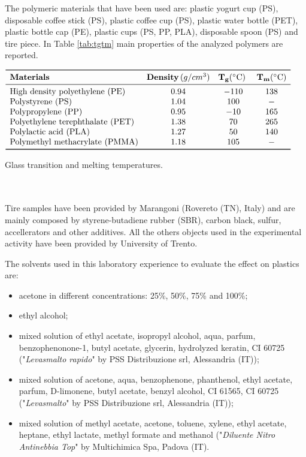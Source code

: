 \documentclass[a4paper, 11pt]{article}
\begin{document}
The polymeric materials that have been used are: plastic yogurt cup (PS), disposable coffee stick (PS), plastic coffee cup (PS), plastic water bottle (PET), plastic bottle cap (PE), plastic cups (PS, PP, PLA), disposable spoon (PS) and tire piece. In Table \ref{tab:tgtm} main properties of the analyzed polymers are reported. 
\begin{table}[htp]
	\centering
	$
	\begin{array}{lccc}
	\toprule
	\textbf{Materials} &  \mathbf{Density}\,(g/cm^{3})  & \mathbf{T_{g}} (^\circ\text{C}) \ & \mathbf{T_{m}}(^\circ\text{C}) \\
	\midrule
	\text{High density polyethylene (PE)} & 0.94 & -110 & 138 \\
	\text{Polystyrene (PS)} & 1.04 & 100 & -  \\
	\text{Polypropylene (PP)} & 0.95 & -10  & 165  \\
	\text{Polyethylene terephthalate (PET)} & 1.38 & 70 & 265  \\
	\text{Polylactic acid (PLA)} & 1.27 & 50 & 140 \\
	\text{Polymethyl methacrylate (PMMA)} & 1.18 & 105  & - \\
	\bottomrule
	\end{array}
	$
	\caption{Glass transition and melting temperatures.}
	\label{tab:tgtm}
\end{table}\\
\\
Tire samples have been provided by Marangoni (Rovereto (TN), Italy) and are mainly composed by styrene-butadiene rubber (SBR), carbon black, sulfur, accellerators and other additives. All the others objects used in the experimental activity have been provided by University of Trento. \par

The solvents used in this laboratory experience to evaluate the effect on plastics are:
\begin{itemize}
    \item acetone in different concentrations: 25\%, 50\%, 75\% and 100\%;
    \item ethyl alcohol;
    \item mixed solution of ethyl acetate, isopropyl alcohol, aqua, parfum, benzophenonone-1, butyl acetate, glycerin, hydrolyzed keratin, CI 60725 ("\emph{Levasmalto rapido}" by PSS Distribuzione srl, Alessandria (IT));
        \item mixed solution of acetone, aqua, benzophenone, phanthenol, ethyl acetate, parfum, D-limonene, butyl acetate, benzyl alcohol, CI 61565, CI 60725 ("\emph{Levasmalto}" by PSS Distribuzione srl, Alessandria (IT));
    \item mixed solution of methyl acetate, acetone, toluene, xylene, ethyl acetate, heptane, ethyl lactate, methyl formate and methanol ("\textit{Diluente Nitro Antinebbia Top}" by Multichimica Spa, Padova (IT).
\end{itemize}
\end{document}
